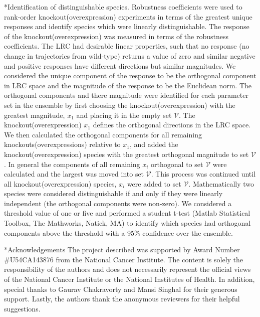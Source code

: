 \documentclass[12pt]{article}
\makeatletter
\renewcommand\subsection{\@startsection
	{subsection}{2}{0mm}
	{-0.05in}
	{-0.5\baselineskip}
	{\normalfont\normalsize\bfseries}}
\renewcommand\section{\@startsection
	{subsection}{2}{0mm}
	{-0.2in}
	{0.05\baselineskip}
	{\normalfont\large\bfseries}}
\makeatother
\begin{document}
\subsection*{Identification of distinguishable species.}
Robustness coefficients were used to rank-order knockout(overexpression) experiments in terms of the greatest unique responses and identify species which were linearly distinguishable. The response of the knockout(overexpression) was measured in terms of the robustness coefficients. The LRC had desirable linear properties, such that no response (no change in trajectories from wild-type) returns a value of zero and similar negative and positive responses have different directions but similar magnitudes. We considered the unique component of the response to be the orthogonal component in LRC space and the magnitude of the response to be the Euclidean norm. The orthogonal components and there magnitude were identified for each parameter set in the ensemble by first choosing the knockout(overexpression) with the greatest magnitude, $x_{1}$ and placing it in the empty set $\mathcal{V}$. The knockout(overexpression) $x_{1}$ defines the orthogonal directions in the LRC space. We then calculated the orthogonal components for all remaining knockouts(overexpressions) relative to $x_{1}$, and added the knockout(overexpression) species with the greatest orthogonal magnitude to set $\mathcal{V}$. In general the components of all remaining $x_{i}$ orthogonal to set $\mathcal{V}$ were calculated and the largest was moved into set $\mathcal{V}$. This process was continued until all knockout(overexpression) species, $x_{i}$ were added to set $\mathcal{V}$. Mathematically two species were considered distinguishable if and only if they were linearly independent (the orthogonal components were non-zero). We considered a threshold value of one or five and performed a student t-test (Matlab Statistical Toolbox, The Mathworks, Natick, MA) to identify which species had orthogonal components above the threshold with a 95\% confidence over the ensemble. 

\section*{Acknowledgements}
The project described was supported by Award Number \#U54CA143876 from the National Cancer Institute.  
The content is solely the responsibility of the authors and does not necessarily represent the official views of the National Cancer Institute or the National Institutes of Health. 
In addition, special thanks to Gaurav Chakravorty and Mansi Singhal for their generous support. 
Lastly, the authors thank the anonymous reviewers for their helpful suggestions.

\clearpage


\clearpage


\clearpage


%
\end{document}
